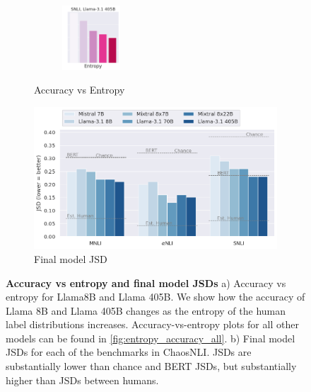 \begin{figure}
\begin{subfigure}[b]{0.3\textwidth}
\begin{subfigure}[b]{0.48\textwidth}
        \end{subfigure}
        \begin{subfigure}[b]{0.35\textwidth}
            \includegraphics[height=2.4cm, trim=10 0 0 0, clip]{figures/entropy_acc_snli_405B}
        \end{subfigure}
        \caption{Accuracy vs Entropy}
         \label{fig:entropy_accuracy}
    \end{subfigure}
    \hspace{5mm}
    \begin{subfigure}[b]{0.65\textwidth}
    \includegraphics[width=\linewidth]{figures/jsd_all_benchmarks}
    \caption{Final model JSD}
    \label{fig:jsd_all_benchmarks}
    \end{subfigure}
    \caption{\textbf{Accuracy vs entropy and final model JSDs} 
    a) Accuracy vs entropy for Llama8B and Llama 405B. 
     We show how the accuracy of Llama 8B and Llama 405B changes as the entropy of the human label distributions increases. Accuracy-vs-entropy plots for all other models can be found in \cref{fig:entropy_accuracy_all}.
    b) Final model JSDs for each of the benchmarks in ChaosNLI. 
    JSDs are substantially lower than chance and BERT JSDs, but substantially higher than JSDs between humans.
    }
\end{figure}

